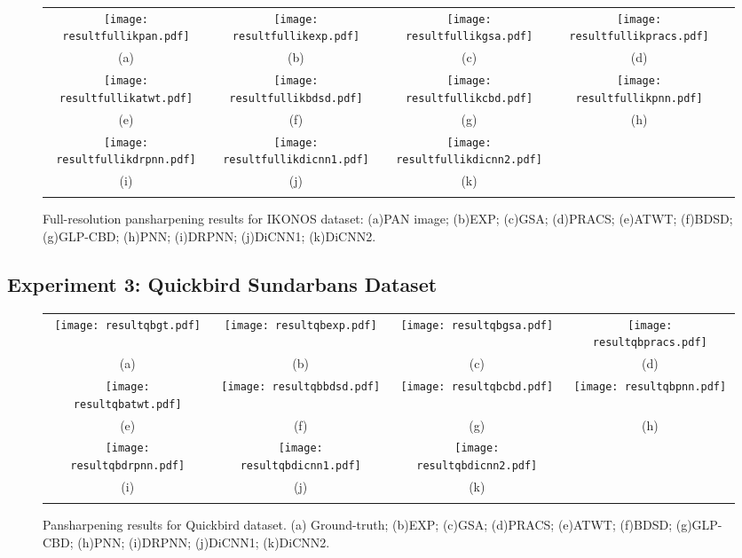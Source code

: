 \documentclass[journal]{IEEEtran}
\begin{document}
\begin{figure*}[t]\scriptsize
\centering
  \begin{tabular}{ccccc}
\texttt{[image: resultfullikpan.pdf]} &
\texttt{[image: resultfullikexp.pdf]} &
\texttt{[image: resultfullikgsa.pdf]} &
\texttt{[image: resultfullikpracs.pdf]} \\
(a) & (b) & (c) & (d) \\
\texttt{[image: resultfullikatwt.pdf]}&
\texttt{[image: resultfullikbdsd.pdf]}&
\texttt{[image: resultfullikcbd.pdf]}&
\texttt{[image: resultfullikpnn.pdf]} \\
(e) &(f) &(g) &(h) \\
\texttt{[image: resultfullikdrpnn.pdf]} &
\texttt{[image: resultfullikdicnn1.pdf]} &
\texttt{[image: resultfullikdicnn2.pdf]} \\
(i) &(j) & (k)  \\
\\
\end{tabular}
\caption{Full-resolution pansharpening results for IKONOS dataset: (a)PAN image; (b)EXP; (c)GSA; (d)PRACS; (e)ATWT; (f)BDSD; (g)GLP-CBD; (h)PNN; (i)DRPNN; (j)DiCNN1; (k)DiCNN2.}
\label{figure:map:full-ik}
\end{figure*}

\subsection{Experiment 3: Quickbird Sundarbans Dataset}

\begin{figure*}[t]\scriptsize
\centering
  \begin{tabular}{cccc}
\texttt{[image: resultqbgt.pdf]} &
\texttt{[image: resultqbexp.pdf]} &
\texttt{[image: resultqbgsa.pdf]} &
\texttt{[image: resultqbpracs.pdf]} \\
(a) & (b) & (c)  & (d) \\
\texttt{[image: resultqbatwt.pdf]}&
\texttt{[image: resultqbbdsd.pdf]} &
\texttt{[image: resultqbcbd.pdf]} &
\texttt{[image: resultqbpnn.pdf]}  \\
 (e) & (f) & (g) & (h) \\
\texttt{[image: resultqbdrpnn.pdf]} &
\texttt{[image: resultqbdicnn1.pdf]} &
\texttt{[image: resultqbdicnn2.pdf]} \\
 (i) & (j) & (k)  \\
\\
\end{tabular}
\caption{Pansharpening results for Quickbird dataset. (a) Ground-truth; (b)EXP; (c)GSA; (d)PRACS; (e)ATWT; (f)BDSD;  (g)GLP-CBD; (h)PNN; (i)DRPNN; (j)DiCNN1; (k)DiCNN2.}
\label{figure:map:qb}
\end{figure*}
\end{document}
